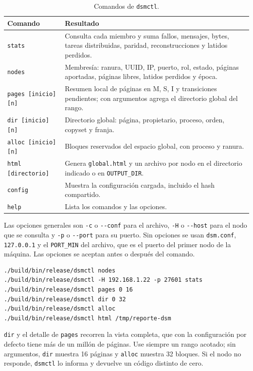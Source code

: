 \begin{table}[H]
\centering
\small
\caption{Comandos de \texttt{dsmctl}.}
\label{tab:dsmctl}
\begin{tabularx}{\textwidth}{@{}l Y@{}}
\toprule
Comando & Resultado \\
\midrule
\texttt{stats} & Consulta cada miembro y suma fallos, mensajes, bytes, tareas distribuidas, paridad, reconstrucciones y latidos perdidos. \\
\texttt{nodes} & Membresía: ranura, UUID, IP, puerto, rol, estado, páginas aportadas, páginas libres, latidos perdidos y época. \\
\texttt{pages [inicio] [n]} & Resumen local de páginas en M, S, I y transiciones pendientes; con argumentos agrega el directorio global del rango. \\
\texttt{dir [inicio] [n]} & Directorio global: página, propietario, proceso, orden, copyset y franja. \\
\texttt{alloc [inicio] [n]} & Bloques reservados del espacio global, con proceso y ranura. \\
\texttt{html [directorio]} & Genera \texttt{global.html} y un archivo por nodo en el directorio indicado o en \texttt{OUTPUT\_DIR}. \\
\texttt{config} & Muestra la configuración cargada, incluido el hash compartido. \\
\texttt{help} & Lista los comandos y las opciones. \\
\bottomrule
\end{tabularx}
\end{table}

Las opciones generales son \texttt{-c} o \texttt{-{}-conf} para el archivo, \texttt{-H} o \texttt{-{}-host} para el nodo que se consulta y \texttt{-p} o \texttt{-{}-port} para su puerto. Sin opciones se usan \texttt{dsm.conf}, \texttt{127.0.0.1} y el \texttt{PORT\_MIN} del archivo, que es el puerto del primer nodo de la máquina. Las opciones se aceptan antes o después del comando.

\begin{lstlisting}
./build/bin/release/dsmctl nodes
./build/bin/release/dsmctl -H 192.168.1.22 -p 27601 stats
./build/bin/release/dsmctl pages 0 16
./build/bin/release/dsmctl dir 0 32
./build/bin/release/dsmctl alloc
./build/bin/release/dsmctl html /tmp/reporte-dsm
\end{lstlisting}

\texttt{dir} y el detalle de \texttt{pages} recorren la vista completa, que con la configuración por defecto tiene más de un millón de páginas. Use siempre un rango acotado; sin argumentos, \texttt{dir} muestra 16 páginas y \texttt{alloc} muestra 32 bloques. Si el nodo no responde, \texttt{dsmctl} lo informa y devuelve un código distinto de cero.


